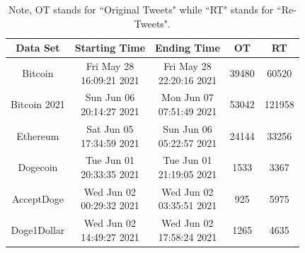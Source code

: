 \documentclass[a4paper,11pt]{article}
\begin{document}
\begin{table}[h!]
    \centering
     \begin{tabular}{||c c c c c||} 
     \hline
     Data Set & Starting Time & Ending Time & OT & RT\\ [0.5ex] 
    \hline\hline
     Bitcoin & \makecell{Fri May 28 \\ 16:09:21 2021} & \makecell{Fri May 28 
     \\ 22:20:16 2021} &   39480 & 60520 \\ 
    \hline
    Bitcoin 2021 & \makecell{Sun Jun 06 \\ 20:14:27 2021} & \makecell{Mon Jun 07\\
     07:51:49 2021} &  53042 & 121958 \\ 
   \hline
     Ethereum & \makecell{Sat Jun 05 \\ 17:34:59 2021} & \makecell{Sun Jun 06 \\
      05:22:57 2021} & 24144 & 33256 \\
    \hline
    Dogecoin & \makecell{Tue Jun 01 \\ 20:33:35 2021} & \makecell{Tue Jun 01\\
     21:19:05 2021} & 1533 & 3367 \\
    \hline
     AcceptDoge & \makecell{Wed Jun 02 \\ 00:29:32 2021} & \makecell{Wed Jun 02
      \\ 03:35:51 2021} & 925 & 5975 \\
    \hline
     Doge1Dollar & \makecell{Wed Jun 02 \\ 14:49:27 2021} & \makecell{Wed Jun 02
      \\ 17:58:24 2021} & 1265 & 4635 \\
    \hline\hline
     \end{tabular}
\caption{Note, OT stands for ``Original Tweets" while ``RT" stands for ``Re-Tweets".}
\end{table}
\end{document}
